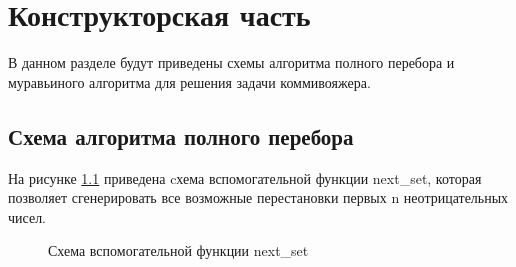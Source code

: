 \chapter{Конструкторская часть}

В данном разделе будут приведены схемы алгоритма полного перебора и муравьиного алгоритма для решения задачи коммивояжера.

\section{Схема алгоритма полного перебора}

На рисунке \ref{fig:next_set} приведена cхема вспомогательной функции next\_set, которая позволяет сгенерировать все возможные перестановки первых n неотрицательных чисел.

\clearpage
\begin{figure}[h!]
	
	
	\caption{Схема вспомогательной функции next\_set}
	
	\label{fig:next_set}
	
\end{figure}

